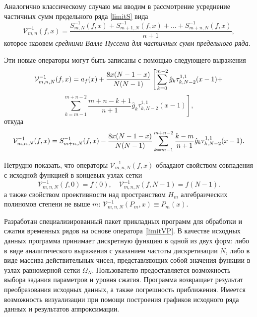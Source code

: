 Аналогично классическому случаю мы вводим в рассмотрение усреднение частичных сумм предельного ряда \eqref{limitS} вида
\begin{equation}\label{limitVP}
  \mathcal{V}^{-1}_{m,n}(f,x) = \frac{S_{m,N}^{-1}(f,x) + S_{m+1,N}^{-1}(f,x) + \ldots + S_{m+n,N}^{-1}(f,x)}{n+1},
\end{equation}
которое назовем \textit{средними Валле Пуссена для частичных сумм предельного ряда}.

Эти новые операторы могут быть записаны с помощью следующего выражения
$$
\mathcal{V}_{m,n,N}^{-1}(f,x)=
a_f(x) + { 8x(N-1-x)\over N(N-1)}
\left[
\sum_{k=0}^{m-2}\hat g_k\tau_{k,N-2}^{1,1}(x-1) + \right.
$$
\begin{equation*}
\left.
\sum_{k=m-1}^{m+n-2} \frac{m+n-k+1}{n+1} \hat g_k \tau_{k,N-2}^{1,1}(x-1)
\right],
\end{equation*}
откуда
$$
\mathcal{V}_{m,n,N}^{-1}(f,x)=
S_{m+n,N}^{-1}(f,x) -
{ 8x(N-1-x)\over N(N-1)}
\sum_{k=m-1}^{m+n-2} \frac{k-m}{n+1} \hat g_k \tau_{k,N-2}^{1,1}(x-1).
$$

Нетрудно показать, что операторы $\mathcal{V}_{m,n,N}^{-1}(f,x)$ обладают свойством совпадения с исходной функцией в концевых узлах сетки
$$
\mathcal{V}_{m,n,N}^{-1}(f,0)= f(0), \quad \mathcal{V}_{m,n,N}^{-1}(f,N-1)= f(N-1).
$$
а также свойством проективности над пространством $H_{m}$ алгебраических полиномов степени не выше $m$: $\mathcal{V}_{m,n,N}^{-1}(P_m,x)\equiv P_m(x)$.

%

Разработан специализированный пакет прикладных программ для обработки и сжатия временных рядов на основе оператора \eqref{limitVP}. В качестве исходных данных программа принимает дискретную функцию в одной из двух форм: либо в виде аналитического выражения с указанием частоты дискретизации $N$, либо в виде массива действительных чисел, представляющих собой значения функции в узлах равномерной сетки $\Omega_N$.
Пользователю предоставляется возможность выбора задания параметров и уровня сжатия.
Программа возвращает результат преобразования исходных данных, а также погрешность приближения.
Имеется возможность визуализации при помощи построения  графиков исходного ряда данных и результатов аппроксимации.

